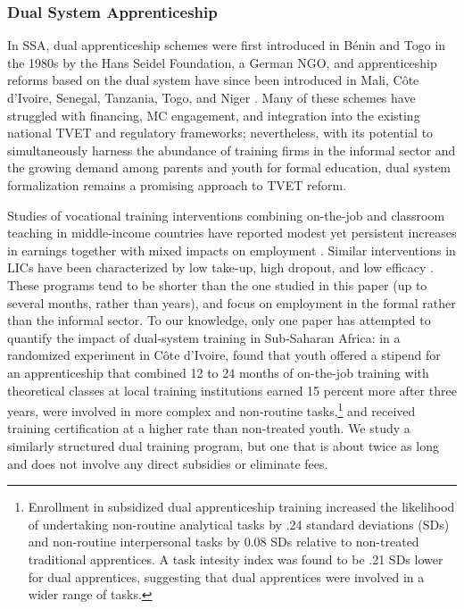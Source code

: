 \documentclass[
  a4paper, twoside, 12pt]{book}
\renewcommand{\hl}[1]{#1}
\begin{document}
\hypertarget{section-1}{%
\subsubsection*{\texorpdfstring{\hl{Dual System Apprenticeship}}{}}\label{section-1}}


In SSA, dual apprenticeship schemes were first introduced in Bénin and Togo in the 1980s by the Hans Seidel Foundation, a German NGO, and apprenticeship reforms based on the dual system have since been introduced in Mali, Côte d'Ivoire, Senegal, Tanzania, Togo, and Niger \autocite{walther2011,ilo2020a}. Many of these schemes have struggled with financing, MC engagement, and integration into the existing national TVET and regulatory frameworks; nevertheless, with its potential to simultaneously harness the abundance of training firms in the informal sector and the growing demand among parents and youth for formal education, dual system formalization remains a promising approach to TVET reform.

Studies of vocational training interventions combining on-the-job and classroom teaching in middle-income countries have reported modest yet persistent increases in earnings together with mixed impacts on employment \autocite{card2011,attanasio2011,ibarraran2014,alzua2016,attanasio2017,ibarraran2019}. Similar interventions in LICs have been characterized by low take-up, high dropout, and low efficacy \autocites[see][]{blattman2015,ghisletta2021}[ for an overview]{tripney2013}. These programs tend to be shorter than the one studied in this paper (up to several months, rather than years), and focus on employment in the formal rather than the informal sector. To our knowledge, only one paper has attempted to quantify the impact of dual-system training in Sub-Saharan Africa: in a randomized experiment in Côte d'Ivoire, \textcite{crepon2019} found that youth offered a stipend for an apprenticeship that combined 12 to 24 months of on-the-job training with theoretical classes at local training institutions earned 15 percent more after three years, were involved in more complex and non-routine tasks,\footnote{Enrollment in subsidized dual apprenticeship training increased the likelihood of undertaking non-routine analytical tasks by .24 standard deviations (SDs) and non-routine interpersonal tasks by 0.08 SDs relative to non-treated traditional apprentices. A task intesity index was found to be .21 SDs lower for dual apprentices, suggesting that dual apprentices were involved in a wider range of tasks.} and received training certification at a higher rate than non-treated youth. We study a similarly structured dual training program, but one that is about twice as long and does not involve any direct subsidies or eliminate fees.
\end{document}
